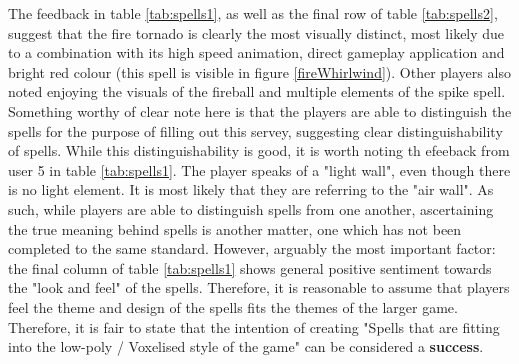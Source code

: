 \documentclass[12pt,a4paper]{report}
\begin{document}
The feedback in table \ref{tab:spells1}, as well as the final row of table \ref{tab:spells2}, suggest that the fire tornado is clearly the most visually distinct, most likely due to a combination with its high speed animation, direct gameplay application and bright red colour (this spell is visible in figure \ref{fireWhirlwind}). Other players also noted enjoying the visuals of the fireball and multiple elements of the spike spell. Something worthy of clear note here is that the players are able to distinguish the spells for the purpose of filling out this servey, suggesting clear distinguishability of spells. While this distinguishability is good, it is worth noting th efeeback from user 5 in table \ref{tab:spells1}. The player speaks of a "light wall", even though there is no light element. It is most likely that they are referring to the "air wall". As such, while players are able to distinguish spells from one another, ascertaining the true meaning behind spells is another matter, one which has not been completed to the same standard. However, arguably the most important factor: the final column of table \ref{tab:spells1} shows general positive sentiment towards the "look and feel" of the spells. Therefore, it is reasonable to assume that players feel the theme and design of the spells fits the themes of the larger game. Therefore, it is fair to state that the intention of creating "Spells that are fitting into the low-poly / Voxelised style of the game" can be considered a \textbf{success}.
\end{document}
